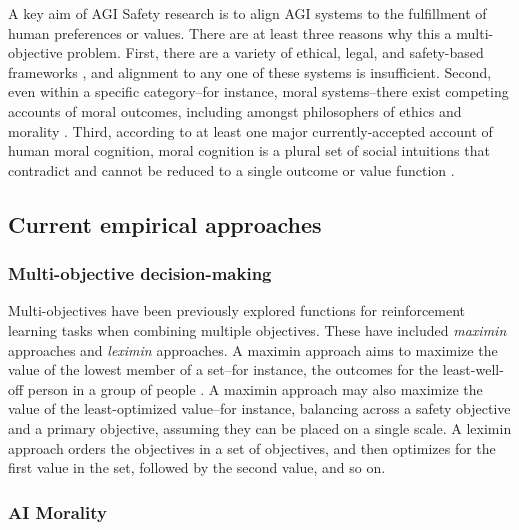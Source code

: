 

A key aim of AGI Safety research is to align AGI systems to the fulfillment of human preferences \cite{Bostrom2014, russell2019human} or values. There are at least three reasons why this a multi-objective problem. First, there are a variety of ethical, legal, and safety-based frameworks \cite{vamplew_human-aligned_2018}, and alignment to any one of these systems is insufficient. Second, even within a specific category--for instance, moral systems--there exist competing accounts of moral outcomes, including amongst philosophers of ethics and morality \cite{bogosian_implementation_2017}. Third, according to at least one major currently-accepted account of human moral cognition, moral cognition is a plural set of social intuitions that contradict and cannot be reduced to a single outcome or value function \cite{haidt2001emotional,sotala2016defining}.

\subsection{Current empirical approaches}

\subsubsection{Multi-objective decision-making}
Multi-objectives have been previously explored \cite{vamplew_human-aligned_2018,vamplew_potential-based_2021} functions for reinforcement learning tasks when combining multiple objectives. 
These have included \textit{maximin} approaches and \textit{leximin} approaches. A maximin approach aims to maximize the value of the lowest member of a set--for instance, the outcomes for the least-well-off person in a group of people \cite{rawls2001justice}. A maximin approach may also maximize the value of the least-optimized value--for instance, balancing across a safety objective and a primary objective, assuming they can be placed on a single scale. A leximin approach orders the objectives in a set of objectives, and then optimizes for the first value in the set, followed by the second value, and so on.

\subsubsection{AI Morality}

